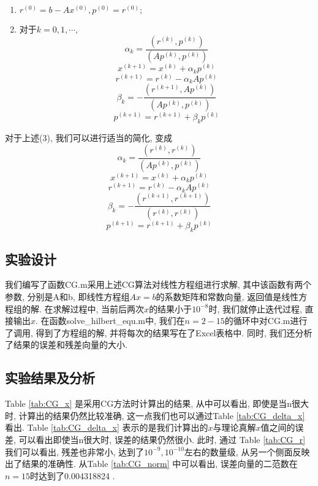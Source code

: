 \documentclass[a4paper]{article}
\begin{document}
\begin{CJK*}{GBK}{song}
\begin{enumerate}[(1)]
\item $r^{(0)}=b-Ax^{(0)}, p^{(0)}=r^{(0)};$
\item 对于$k=0,1,\cdots,$
$$\alpha_k= \frac{(r^{(k)},p^{(k)})}{(Ap^{(k)},p^{(k)})}$$
$$x^{(k+1)}=x^{(k)}+\alpha_kp^{(k)}$$
$$r^{(k+1)}=r^{(k)}-\alpha_kAp^{(k)}$$
$$\beta_{k}= -\frac{(r^{(k+1)},Ap^{(k)})}{(Ap^{(k)},p^{(k)})}$$
$$p^{(k+1)}=r^{(k+1)}+\beta_{k} p^{(k)}$$
\end{enumerate}
对于上述(3), 我们可以进行适当的简化, 变成
$$\alpha_k= \frac{(r^{(k)},r^{(k)})}{(Ap^{(k)},p^{(k)})}$$
$$x^{(k+1)}=x^{(k)}+\alpha_kp^{(k)}$$
$$r^{(k+1)}=r^{(k)}-\alpha_kAp^{(k)}$$
$$\beta_{k}= -\frac{(r^{(k+1)},r^{(k+1)})}{(r^{(k)},r^{(k)})}$$
$$p^{(k+1)}=r^{(k+1)}+\beta_{k} p^{(k)}$$

\subsection{实验设计}
我们编写了函数CG.m采用上述CG算法对线性方程组进行求解, 其中该函数有两个参数, 分别是A和b, 即线性方程组$Ax=b$的系数矩阵和常数向量, 返回值是线性方程组的解. 在求解过程中, 当前后两次$x$的结果小于$10^{-8}$时, 我们就停止迭代过程, 直接输出$x$. 在函数solve\_hilbert\_equ.m中, 我们在$n=2-15$的循环中对CG.m进行了调用, 得到了方程组的解, 并将每次的结果写在了Excel表格中. 同时, 我们还分析了结果的误差和残差向量的大小.

\subsection{实验结果及分析}
Table \ref{tab:CG_x} 是采用CG方法时计算出的结果, 从中可以看出, 即使是当n很大时, 计算出的结果仍然比较准确, 这一点我们也可以通过Table \ref{tab:CG_delta_x} 看出. Table \ref{tab:CG_delta_x} 表示的是我们计算出的$x$与理论真解$x$值之间的误差, 可以看出即使当n很大时, 误差的结果仍然很小. 此时, 通过 Table \ref{tab:CG_r} 我们可以看出, 残差也非常小, 达到了$10^{-9}, 10^{-10}$左右的数量级, 从另一个侧面反映出了结果的准确性. 从Table \ref{tab:CG_norm} 中可以看出, 误差向量的二范数在$n=15$时达到了0.004318824
.


\end{CJK*}
\end{document}
